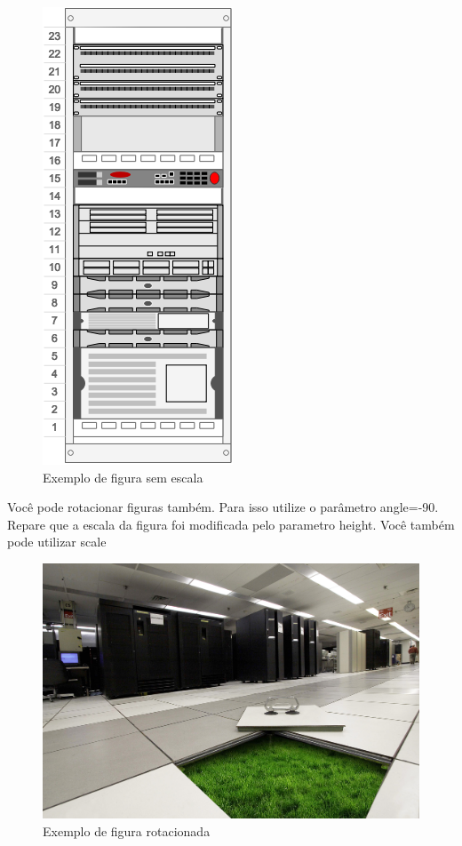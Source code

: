 \documentclass[	DIV=calc,%
							paper=a4,%
							fontsize=12pt,%
							onecolumn]{scrartcl}	 					%
\begin{document}
\begin{figure}
	\centering
	\includegraphics[]{fig2}
	\caption{Exemplo de figura sem escala}
	\label{fig2}
\end{figure}

Você pode rotacionar figuras também. Para isso utilize o parâmetro angle=-90. Repare que a escala da figura foi modificada pelo parametro height. Você também pode utilizar scale

\begin{figure}
	\centering
	\includegraphics[height=\textwidth,angle=-90]{fig3}
	\caption{Exemplo de figura rotacionada}
	\label{fig3}
\end{figure}
\end{document}
